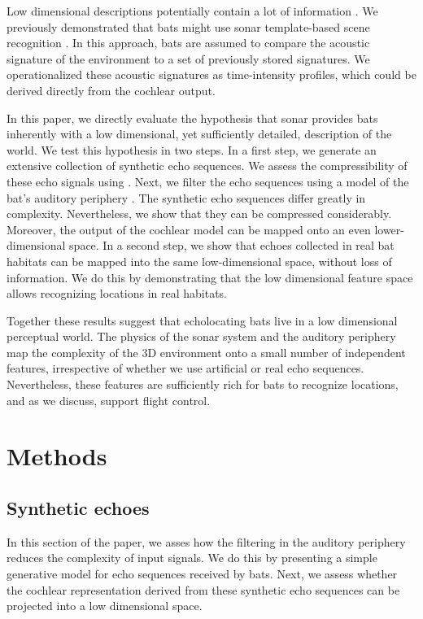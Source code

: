 \documentclass[preprint,5p]{elsarticle}
\begin{document}
Low dimensional descriptions potentially contain a lot of information \citep{Kuc1997b,Kuc1997}. We previously demonstrated that bats might use sonar template-based scene recognition \citep{Vanderelst2016,Vanderelst2017}. In this approach, bats are assumed to compare the acoustic signature of the environment to a set of previously stored signatures. We operationalized these acoustic signatures as time-intensity profiles, which could be derived directly from the cochlear output.

In this paper, we directly evaluate the hypothesis that sonar provides bats inherently with a low dimensional, yet sufficiently detailed, description of the world. We test this hypothesis in two steps. In a first step, we generate an extensive collection of synthetic echo sequences. We assess the compressibility of these echo signals using \PCA. Next, we filter the echo sequences using a model of the bat's auditory periphery \citep{Wiegrebe2008}. The synthetic echo sequences differ greatly in complexity. Nevertheless, we show that they can be compressed considerably. Moreover, the output of the cochlear model can be mapped onto an even lower-dimensional space. In a second step, we show that echoes collected in real bat habitats can be mapped into the same low-dimensional space, without loss of information. We do this by demonstrating that the low dimensional feature space allows recognizing locations in real habitats. 

Together these results suggest that echolocating bats live in a low dimensional perceptual world. The physics of the sonar system and the auditory periphery map the complexity of the 3D environment onto a small number of independent features, irrespective of whether we use artificial or real echo sequences. Nevertheless, these features are sufficiently rich for bats to recognize locations, and as we discuss, support flight control.

\section{Methods}

\subsection{Synthetic echoes}

In this section of the paper, we asses how the filtering in the auditory periphery reduces the complexity of input signals. We do this by presenting a simple generative model for echo sequences received by bats. Next, we assess whether the cochlear representation derived from these synthetic echo sequences can be projected into a low dimensional space. 
\end{document}
